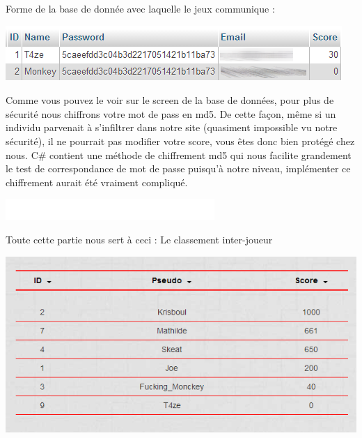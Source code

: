 \documentclass [11pt]{report}
\begin{document}
	\vspace{4mm}
	
	\noindent Forme de la base de donnée avec laquelle le jeux communique :
	\begin{center}
		\includegraphics[scale = 0.8]{images/Bdd.png}
	\end{center}
		
		
	\vspace{10mm}
	
	Comme vous pouvez le voir sur le screen de la base de données, pour plus de sécurité nous chiffrons votre mot de pass en md5. De cette façon, même si un individu parvenait à s'infiltrer dans notre site (quasiment impossible vu notre sécurité), il ne pourrait pas modifier votre score, vous êtes donc bien protégé chez nous. C\# contient une méthode de chiffrement md5 qui nous facilite grandement le test de correspondance de mot de passe puisqu'à notre niveau, implémenter ce chiffrement aurait été vraiment compliqué.
	
		
	\newpage
	
	\begin{center}
			\includegraphics[scale = 0.3]{images/blanc.png}
		\end{center}
	
	\noindent Toute cette partie nous sert à ceci : Le classement inter-joueur
	
	\begin{center}
		\includegraphics[scale = 0.6]{images/classement.png}
	\end{center}
			
\end{document}
